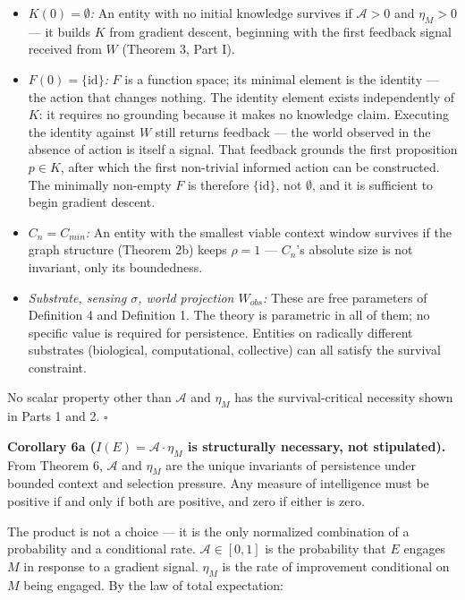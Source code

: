 \documentclass[
]{article}
\providecommand{\tightlist}{%
  \setlength{\itemsep}{0pt}\setlength{\parskip}{0pt}}
\begin{document}
\begin{itemize}
\tightlist
\item
  \emph{\(K(0) = \emptyset\):} An entity with no initial knowledge
  survives if \(\mathcal{A} > 0\) and \(\eta_M > 0\) --- it builds \(K\)
  from gradient descent, beginning with the first feedback signal
  received from \(W\) (Theorem 3, Part I).
\item
  \emph{\(F(0) = \{\text{id}\}\):} \(F\) is a function space; its
  minimal element is the identity --- the action that changes nothing.
  The identity element exists independently of \(K\): it requires no
  grounding because it makes no knowledge claim. Executing the identity
  against \(W\) still returns feedback --- the world observed in the
  absence of action is itself a signal. That feedback grounds the first
  proposition \(p \in K\), after which the first non-trivial informed
  action can be constructed. The minimally non-empty \(F\) is therefore
  \(\{\text{id}\}\), not \(\emptyset\), and it is sufficient to begin
  gradient descent.
\item
  \emph{\(C_n = C_{min}\):} An entity with the smallest viable context
  window survives if the graph structure (Theorem 2b) keeps \(\rho = 1\)
  --- \(C_n\)'s absolute size is not invariant, only its boundedness.
\item
  \emph{Substrate, sensing \(\sigma\), world projection \(W_{obs}\):}
  These are free parameters of Definition 4 and Definition 1. The theory
  is parametric in all of them; no specific value is required for
  persistence. Entities on radically different substrates (biological,
  computational, collective) can all satisfy the survival constraint.
\end{itemize}

No scalar property other than \(\mathcal{A}\) and \(\eta_M\) has the
survival-critical necessity shown in Parts 1 and 2. \(\square\)

\textbf{Corollary 6a (\(I(E) = \mathcal{A} \cdot \eta_M\) is
structurally necessary, not stipulated).} From Theorem 6,
\(\mathcal{A}\) and \(\eta_M\) are the unique invariants of persistence
under bounded context and selection pressure. Any measure of
intelligence must be positive if and only if both are positive, and zero
if either is zero.

The product is not a choice --- it is the only normalized combination of
a probability and a conditional rate. \(\mathcal{A} \in [0,1]\) is the
probability that \(E\) engages \(M\) in response to a gradient signal.
\(\eta_M\) is the rate of improvement conditional on \(M\) being
engaged. By the law of total expectation:
\end{document}
